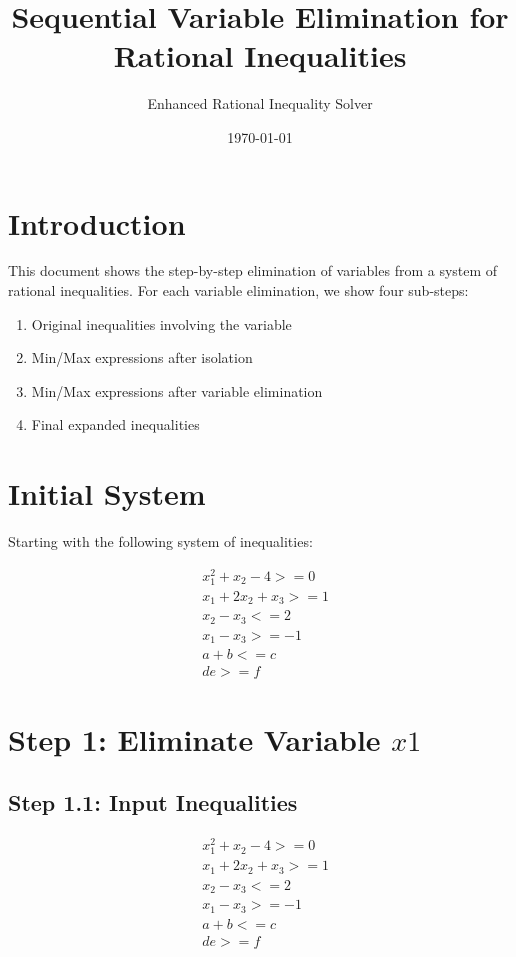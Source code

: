 \documentclass{article}
\title{Sequential Variable Elimination for Rational Inequalities}
\author{Enhanced Rational Inequality Solver}
\date{\today}
\begin{document}
\maketitle

\section{Introduction}

This document shows the step-by-step elimination of variables from a system of rational inequalities. 
For each variable elimination, we show four sub-steps:
\begin{enumerate}
\item Original inequalities involving the variable
\item Min/Max expressions after isolation
\item Min/Max expressions after variable elimination
\item Final expanded inequalities
\end{enumerate}

\section{Initial System}

Starting with the following system of inequalities:

\begin{align}
& x_{1}^{2} + x_{2} - 4 >= 0 \\
& x_{1} + 2 x_{2} + x_{3} >= 1 \\
& x_{2} - x_{3} <= 2 \\
& x_{1} - x_{3} >= -1 \\
& a + b <= c \\
& d e >= f
\end{align}

\section{Step 1: Eliminate Variable $x1$}

\subsection{Step 1.1: Input Inequalities}

\begin{align}
& x_{1}^{2} + x_{2} - 4 >= 0 \\
& x_{1} + 2 x_{2} + x_{3} >= 1 \\
& x_{2} - x_{3} <= 2 \\
& x_{1} - x_{3} >= -1 \\
& a + b <= c \\
& d e >= f
\end{align}
\end{document}

